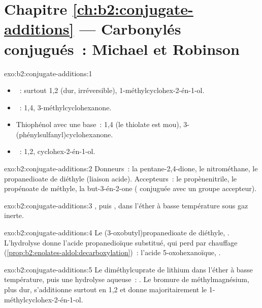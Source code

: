 \section*{Chapitre \ref{ch:b2:conjugate-additions} --- Carbonylés conjugués~: Michael et Robinson}

\begin{solution}{exo:b2:conjugate-additions:1}
\begin{itemize}
  \item {}~: surtout 1,2 (dur, irréversible), 1-méthylcyclohex-2-én-1-ol.
  \item {}~: 1,4, 3-méthylcyclohexanone.
  \item Thiophénol avec une base~: 1,4 (le thiolate est mou), 3-(phénylsulfanyl)cyclohexanone.
  \item {}~: 1,2, cyclohex-2-én-1-ol.
\end{itemize}
\end{solution}

\begin{solution}{exo:b2:conjugate-additions:2}
Donneurs~: la pentane-2,4-dione, le nitrométhane, le propanedioate de diéthyle (liaison  acide).
Accepteurs~: le propènenitrile, le propénoate de méthyle, la but-3-én-2-one ( conjuguée avec
un groupe accepteur).
\end{solution}

\begin{solution}{exo:b2:conjugate-additions:3}
, puis , dans l'éther à basse
température sous gaz inerte.
\end{solution}

\begin{solution}{exo:b2:conjugate-additions:4}
Le (3-oxobutyl)propanedioate de diéthyle, . L'hydrolyse donne l'acide
propanedioïque substitué, qui perd  par chauffage (\cref{prop:b2:enolates-aldol:decarboxylation})~:
l'acide 5-oxohexanoïque, .
\end{solution}

\begin{solution}{exo:b2:conjugate-additions:5}
Le diméthylcuprate de lithium dans l'éther à basse température, puis une hydrolyse aqueuse~: . Le bromure de méthylmagnésium, plus dur, s'additionne surtout en 1,2 et donne
majoritairement le 1-méthylcyclohex-2-én-1-ol.
\end{solution}

